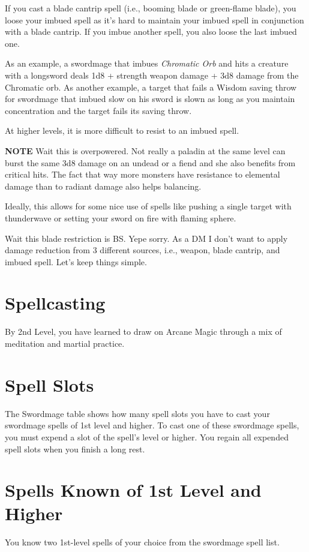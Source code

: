 \begin{multicols*}{2}
If you cast a blade cantrip spell (i.e., booming blade or green-flame blade), you loose your imbued spell as it's hard to  maintain your imbued spell in conjunction with a blade cantrip. If you imbue another spell, 
you also loose the last imbued one. 

As an example, a swordmage that imbues \textit{Chromatic Orb} and hits a creature with 
a longsword deals 1d8 + strength weapon damage + 3d8 damage from the Chromatic orb. 
As another example, a target that fails a Wisdom saving throw for swordmage that imbued slow on his sword 
is slown as long as you maintain concentration and the target fails its saving throw.


At higher levels, it is more difficult to resist to an imbued spell.

\smallskip

{\color{red} \textbf{NOTE} Wait this is overpowered. Not really a paladin at the same level can burst the same 3d8 damage on an undead or a fiend and she also benefits from critical hits. The fact that way more monsters
have resistance to elemental damage than to radiant damage also helps balancing.

Ideally, this allows for some nice use of spells like pushing a single target with thunderwave or setting your sword on fire with flaming sphere. 
}



\smallskip

{\color{red} Wait this blade restriction is BS. Yepe sorry. As a DM I don't want to apply damage reduction from 3 different sources, i.e., weapon, blade cantrip, and imbued spell. Let's keep things simple. }


\section*{Spellcasting}
By 2nd Level, you have learned to draw on Arcane Magic through a mix of meditation and martial practice. 


\section*{Spell Slots}
The Swordmage table shows how many spell slots you have
to cast your swordmage spells of 1st level and higher. To cast
one of these swordmage spells, you must expend a slot of the
spell's level or higher. You regain all expended spell slots
when you finish a long rest.

\section*{Spells Known of 1st Level and Higher}
You know two 1st-level spells of your choice from the
swordmage spell list.


\end{multicols*}
